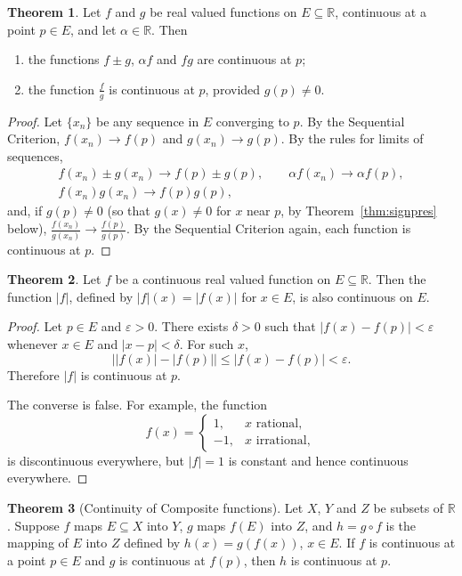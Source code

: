 \documentclass[11pt,a4paper]{article}
\numberwithin{equation}{section}
\theoremstyle{definition}
\newtheorem{thm}{Theorem}[subsection]
\begin{document}
\begin{thm}
Let $f$ and $g$ be real valued functions on $E\subseteq \mathbb{R}$, continuous at a point $p\in E$, and let $\alpha \in \mathbb{R}$. Then
\begin{enumerate}
\item the functions $f\pm g$, $\alpha f$ and $fg$ are continuous at $p$;
\item the function $\frac{f}{g}$ is continuous at $p$, provided $g(p) \neq 0$.
\end{enumerate}
\end{thm}

\begin{proof}
Let $\{x_n\}$ be any sequence in $E$ converging to $p$. By the Sequential Criterion, $f(x_n)\longrightarrow f(p)$ and $g(x_n)\longrightarrow g(p)$. By the rules for limits of sequences,
\begin{gather*}
f(x_n)\pm g(x_n)\longrightarrow f(p)\pm g(p),\qquad \alpha f(x_n)\longrightarrow \alpha f(p),\\
f(x_n)g(x_n)\longrightarrow f(p)g(p),
\end{gather*}
and, if $g(p)\neq0$ (so that $g(x)\neq0$ for $x$ near $p$, by Theorem~\ref{thm:signpres} below), $\frac{f(x_n)}{g(x_n)}\longrightarrow \frac{f(p)}{g(p)}$. By the Sequential Criterion again, each function is continuous at $p$.
\end{proof}


\begin{thm}
Let $f$ be a continuous real valued function on $E\subseteq \mathbb{R}$. Then the function $|f|$, defined by $|f|(x) = |f(x)|$ for $x\in E$, is also continuous on $E$.
\end{thm}

\begin{proof}
Let $p\in E$ and $\varepsilon > 0$. There exists $\delta > 0$ such that $|f(x) - f(p)| < \varepsilon$ whenever $x\in E$ and $|x - p| < \delta$. For such $x$,
$$\bigl||f(x)| - |f(p)|\bigr| \leq |f(x) - f(p)| < \varepsilon .$$
Therefore $|f|$ is continuous at $p$.

The converse is false. For example, the function
$$f(x) = \begin{cases}
1, & x \text{ rational},\\
-1, & x \text{ irrational},
\end{cases}$$
is discontinuous everywhere, but $|f|= 1$ is constant and hence continuous everywhere.
\end{proof}


\begin{thm}[Continuity of Composite functions]
Let $X$, $Y$ and $Z$ be subsets of $\mathbb{R}$. Suppose $f$ maps $E\subseteq X$ into $Y$, $g$ maps $f(E)$ into $Z$, and $h = g\circ f$ is the mapping of $E$ into $Z$ defined by $h(x) = g(f(x))$, $x\in E$. If $f$ is continuous at a point $p\in E$ and $g$ is continuous at $f(p)$, then $h$ is continuous at $p$.
\end{thm}
\end{document}
